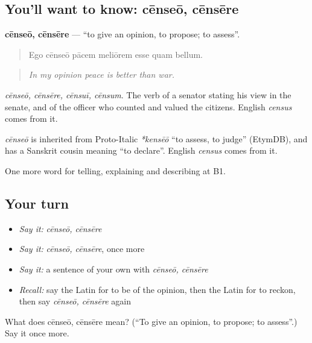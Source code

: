 \subsection*{You'll want to know: cēnseō, cēnsēre}
\textbf{cēnseō, cēnsēre} — \textquotedblleft{}to give an opinion, to propose; to assess\textquotedblright{}.

\begin{quote}
Ego cēnseō pācem meliōrem esse quam bellum.
\end{quote}

\begin{quote}
\emph{In my opinion peace is better than war.}
\end{quote}

\emph{cēnseō, cēnsēre, cēnsuī, cēnsum}. The verb of a senator stating his view in the senate, and of the officer who counted and valued the citizens. English \emph{census} comes from it.

\begin{cousinweb}
\emph{cēnseō} is inherited from Proto-Italic \emph{*kensēō} \textquotedblleft{}to assess, to judge\textquotedblright{} (EtymDB), and has a Sanskrit cousin meaning \textquotedblleft{}to declare\textquotedblright{}. English \emph{census} comes from it.
\end{cousinweb}

\begin{grammarlens}[title={What you've built}]
One more word for telling, explaining and describing at B1.
\end{grammarlens}

\subsection*{Your turn}
\begin{itemize}
\raggedright
  \item \emph{Say it:} \emph{cēnseō, cēnsēre}
  \item \emph{Say it:} \emph{cēnseō, cēnsēre}, once more
  \item \emph{Say it:} a sentence of your own with \emph{cēnseō, cēnsēre}
  \item \emph{Recall:} say the Latin for to be of the opinion, then the Latin for to reckon, then say \emph{cēnseō, cēnsēre} again
\end{itemize}

\begin{tcolorbox}[breakable,colback=teal!4,colframe=teal!35!black,title={Before you move on}]
What does cēnseō, cēnsēre mean? (\textquotedblleft{}To give an opinion, to propose; to assess\textquotedblright{}.) Say it once more.
\end{tcolorbox}

